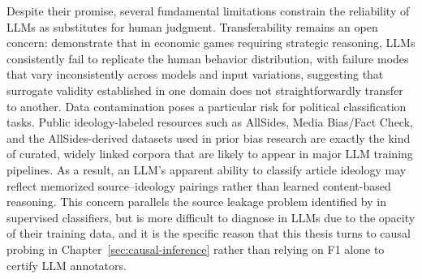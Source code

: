 Despite their promise, several fundamental limitations constrain the reliability of LLMs as substitutes for human judgment. Transferability remains an open concern: \citet{gao2025LLMscaution} demonstrate that in economic games requiring strategic reasoning, LLMs consistently fail to replicate the human behavior distribution, with failure modes that vary inconsistently across models and input variations, suggesting that surrogate validity established in one domain does not straightforwardly transfer to another. Data contamination poses a particular risk for political classification tasks. Public ideology-labeled resources such as AllSides, Media Bias/Fact Check, and the AllSides-derived datasets used in prior bias research are exactly the kind of curated, widely linked corpora that are likely to appear in major LLM training pipelines. As a result, an LLM's apparent ability to classify article ideology may reflect memorized source--ideology pairings rather than learned content-based reasoning. This concern parallels the source leakage problem identified by \citet{baly2020we} in supervised classifiers, but is more difficult to diagnose in LLMs due to the opacity of their training data, and it is the specific reason that this thesis turns to causal probing in Chapter~\ref{sec:causal-inference} rather than relying on F1 alone to certify LLM annotators.


